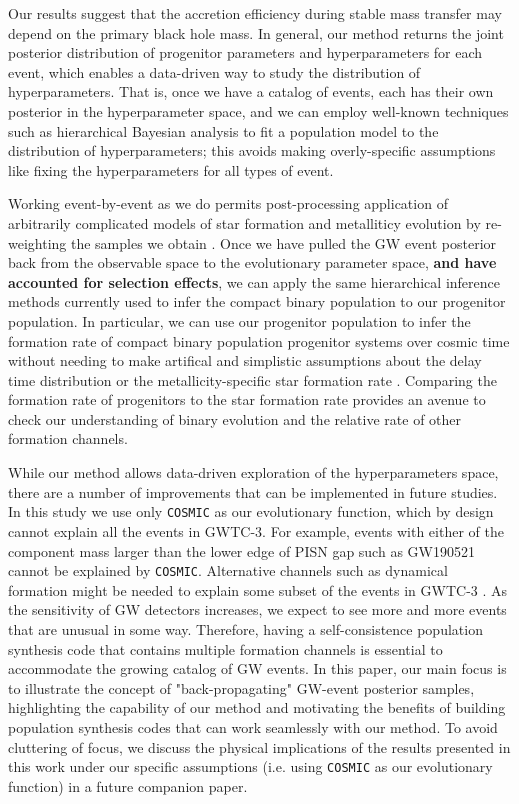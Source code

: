 \documentclass[twocolumn]{aastex631}
\begin{document}
Our results suggest that the accretion efficiency during stable mass transfer
may depend on the primary black hole mass.  In general, our method returns the
joint posterior distribution of progenitor parameters and hyperparameters for
each event, which enables a data-driven way to study the distribution of
hyperparameters.  That is, once we have a catalog of events, each has their own
posterior in the hyperparameter space, and we can employ well-known techniques
such as hierarchical Bayesian analysis to fit a population model to the
distribution of hyperparameters; this avoids making overly-specific assumptions
like fixing the hyperparameters for all types of event.

Working event-by-event as we do permits post-processing application of
arbitrarily complicated models of star formation and metalliticy evolution by
re-weighting the samples we obtain \citep[e.g.][]{VanSon2022}. Once we have
pulled the GW event posterior back from the observable space to the evolutionary
parameter space, \textbf{and have accounted for selection effects}, we can apply
the same hierarchical inference methods currently used to infer the compact
binary population to our progenitor population.  In particular, we can use our
progenitor population to infer the formation rate of compact binary population
progenitor systems over cosmic time without needing to make artifical and
simplistic assumptions about the delay time distribution or the
metallicity-specific star formation rate \citep{Vitale2019,Ng2021,VanSon2022}.
Comparing the formation rate of progenitors to the star formation rate provides
an avenue to check our understanding of binary evolution and the relative rate
of other formation channels.

While our method allows data-driven exploration of the hyperparameters space, there are a number of improvements that can be implemented in future studies.
In this study we use only \texttt{COSMIC} as our evolutionary function, which by design cannot explain all the events in GWTC-3.
For example, events with either of the component mass larger than the lower edge of PISN gap such as GW190521 cannot be explained by \texttt{COSMIC}.
Alternative channels such as dynamical formation might be needed to explain some subset of the events in GWTC-3 \citep{Zevin2021}.
As the sensitivity of GW detectors increases, we expect to see more and more events that are unusual in some way.
Therefore, having a self-consistence population synthesis code that contains multiple formation channels is essential to accommodate the growing catalog of GW events.
In this paper, our main focus is to illustrate the concept of "back-propagating" GW-event posterior samples,
highlighting the capability of our method and motivating the benefits of building population synthesis codes that can work seamlessly with our method.
To avoid cluttering of focus, we discuss the physical implications of the results presented in this work under our specific assumptions (i.e. using \texttt{COSMIC} as our evolutionary function) in a future companion paper.
\end{document}
